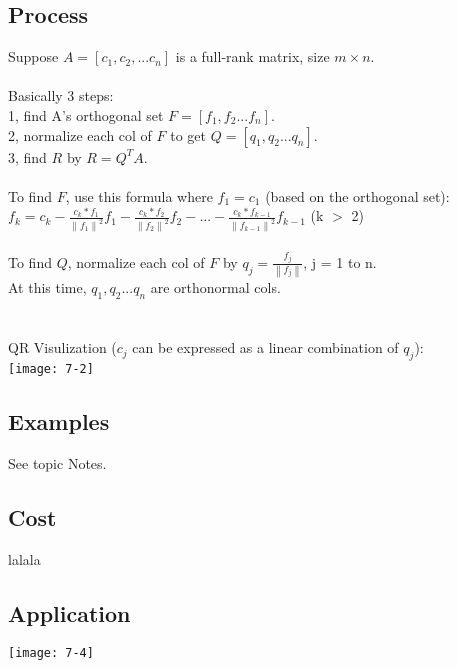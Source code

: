 \documentclass{article}
\begin{document}
\subsection{Process}
Suppose $A = [c_1, c_2, ... c_n]$ is a full-rank matrix, size $m \times n$.\\
\\
Basically 3 steps: \\
1, find A's orthogonal set $F = [f_1, f_2 ... f_n]$.\\
2, normalize each col of $F$ to get $Q = [q_1, q_2 ... q_n]$.\\
3, find $R$ by $R = Q^TA$.\\
\\
To find $F$, use this formula where $f_1 = c_1$ (based on the orthogonal set): \\
$
f_k = c_k - \frac{c_k * f_1}{\left\lVert f_1\right\rVert^2} f_1
- \frac{c_k * f_2}{\left\lVert f_2\right\rVert^2} f_2
- ...
- \frac{c_k * f_{k-1}}{\left\lVert f_{k-1}\right\rVert^2} f_{k-1}
$ (k $>$ 2)
\\
\\
To find $Q$, normalize each col of $F$ by $q_j = \frac{f_j}{\left\lVert f_j\right\rVert }$, j = 1 to n.\\
At this time, $q_1, q_2 ... q_n$ are orthonormal cols.\\
\\
\\
QR Visulization ($c_j$ can be expressed as a linear combination of $q_j$):\\
\texttt{[image: 7-2]}



\subsection*{Examples}
See topic Notes.

\subsection*{Cost}
lalala

\subsection*{Application}
\texttt{[image: 7-4]}\\
\end{document}
